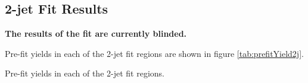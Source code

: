 



\subsection{2-jet Fit Results}

\textbf{The results of the fit are currently blinded.} 

Pre-fit yields in each of the 2-jet fit regions are shown in figure \ref{tab:prefitYield2j}.

\begin{table}[H]
\begin{adjustwidth}{-3em}{-3em}

\label{tab:prefitYield2j}
\caption{Pre-fit yields in each of the 2-jet fit regions.}                                     
\end{adjustwidth}
\end{table}

